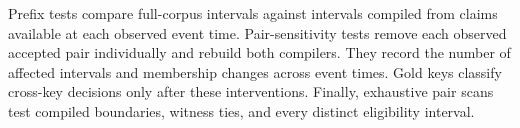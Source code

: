 Prefix tests compare full-corpus intervals against intervals compiled from claims available at each observed event time.
Pair-sensitivity tests remove each observed accepted pair individually and rebuild both compilers.
They record the number of affected intervals and membership changes across event times.
Gold keys classify cross-key decisions only after these interventions.
Finally, exhaustive pair scans test compiled boundaries, witness ties, and every distinct eligibility interval.
